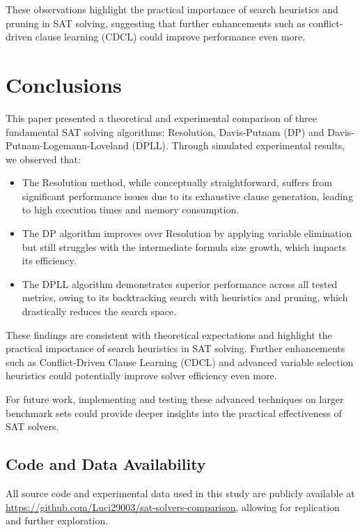 \documentclass{article}
\begin{document}
These observations highlight the practical importance of search heuristics and pruning in SAT solving, suggesting that further enhancements such as conflict-driven clause learning (CDCL) could improve performance even more.

\section{Conclusions}

This paper presented a theoretical and experimental comparison of three fundamental SAT solving algorithms: Resolution, Davis-Putnam (DP) and Davis-Putnam-Logemann-Loveland (DPLL). Through simulated experimental results, we observed that:

\begin{itemize}
    \item The Resolution method, while conceptually straightforward, suffers from significant performance issues due to its exhaustive clause generation, leading to high execution times and memory consumption.
    \item The DP algorithm improves over Resolution by applying variable elimination but still struggles with the intermediate formula size growth, which impacts its efficiency.
    \item The DPLL algorithm demonstrates superior performance across all tested metrics, owing to its backtracking search with heuristics and pruning, which drastically reduces the search space.
\end{itemize}

These findings are consistent with theoretical expectations and highlight the practical importance of search heuristics in SAT solving. Further enhancements such as Conflict-Driven Clause Learning (CDCL) and advanced variable selection heuristics could potentially improve solver efficiency even more.

For future work, implementing and testing these advanced techniques on larger benchmark sets could provide deeper insights into the practical effectiveness of SAT solvers.

\subsection*{Code and Data Availability}

All source code and experimental data used in this study are publicly available at \url{https://github.com/Luci29003/sat-solvers-comparison}, allowing for replication and further exploration.
\end{document}
